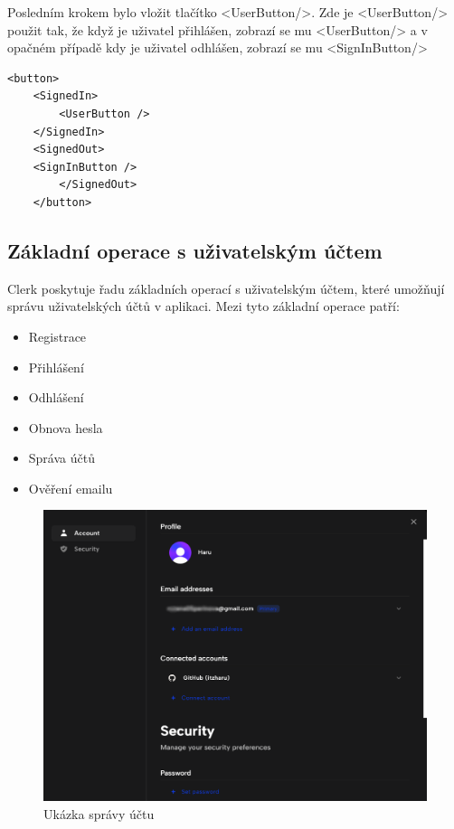 \documentclass[12pt, a4paper,
oneside,      %
openright
]{report}
\begin{document}
\newpage
Posledním krokem bylo vložit tlačítko <UserButton/>. Zde je <UserButton/> použit tak, že když je uživatel přihlášen, zobrazí se mu <UserButton/> a v opačném případě kdy je uživatel odhlášen, zobrazí se mu <SignInButton/>

\vspace{10pt}

\begin{lstlisting}[style=JavaScript, title={Kód}, caption={Ukázka kódu v middleware.ts}] 
	<button>
	<SignedIn>
		<UserButton />
	</SignedIn>
	<SignedOut>
	<SignInButton />
		</SignedOut>
	</button>
\end{lstlisting}

\subsection{Základní operace s uživatelským účtem}
Clerk poskytuje řadu základních operací s uživatelským účtem, které umožňují správu uživatelských účtů v aplikaci. Mezi tyto základní operace patří: 

\begin{itemize}
	\item Registrace
	\item Přihlášení
	\item Odhlášení
	\item Obnova hesla
	\item Správa účtů
	\item Ověření emailu
\end{itemize}

\newpage
\begin{figure}[h]
	\centering
	\includegraphics[width=0.8\linewidth]{image/clerk-profile.png} 
	\caption{Ukázka správy účtu}
\end{figure}
\end{document}
